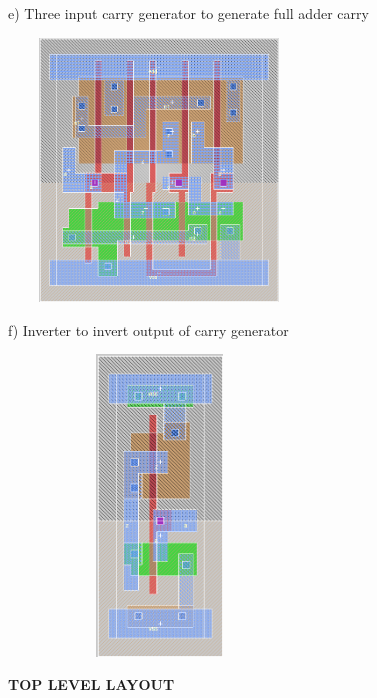 \documentclass[12pt]{report}
\begin{document}
e) Three input carry generator to generate full adder carry
\begin{center}
\includegraphics[height=7cm, width=8cm]{CGIcell}
\end{center}
f) Inverter to invert output of carry generator
\begin{center}
\includegraphics[height=8cm, width=8cm]{INVcell}
\end{center}
\vspace{3pt}
	\begin{flushleft}
		\begin{Large}
			\textbf{TOP LEVEL LAYOUT}
		\end{Large}
	\end{flushleft}
\end{document}
